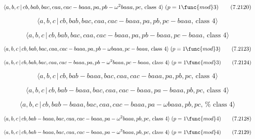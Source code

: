 \documentclass[10pt]{article}
\begin{document}
\begin{equation}
\langle a,b,c\,|\,cb,bab,bac,caa,cac-baaa,pa,pb-\omega ^{2}baaa,pc,\,\text{%
class }4\rangle \;(p=1\func{mod}3)  \tag{7.2120}
\end{equation}

\begin{equation}
\langle a,b,c\,|\,cb,bab,bac,caa,cac-baaa,pa,pb,pc-baaa,\,\text{class }%
4\rangle  \tag{7.2121}
\end{equation}

\begin{equation}
\langle a,b,c\,|\,cb,bab,bac,caa,cac-baaa,pa,pb-baaa,pc-baaa,\,\text{class }%
4\rangle  \tag{7.2122}
\end{equation}

\begin{equation}
\langle a,b,c\,|\,cb,bab,bac,caa,cac-baaa,pa,pb-\omega baaa,pc-baaa,\,\text{%
class }4\rangle \;(p=1\func{mod}3)  \tag{7.2123}
\end{equation}

\begin{equation}
\langle a,b,c\,|\,cb,bab,bac,caa,cac-baaa,pa,pb-\omega ^{2}baaa,pc-baaa,\,%
\text{class }4\rangle \;(p=1\func{mod}3)  \tag{7.2124}
\end{equation}

\begin{equation}
\langle a,b,c\,|\,cb,bab-baaa,bac,caa,cac-baaa,pa,pb,pc,\,\text{class }%
4\rangle  \tag{7.2125}
\end{equation}

\begin{equation}
\langle a,b,c\,|\,cb,bab-baaa,bac,caa,cac-baaa,pa-baaa,pb,pc,\,\text{class }%
4\rangle  \tag{7.2126}
\end{equation}

\begin{equation}
\langle a,b,c\,|\,cb,bab-baaa,bac,caa,cac-baaa,pa-\omega baaa,pb,pc,\,\text{%
class }4\rangle  \tag{7.2127}
\end{equation}

\begin{equation}
\langle a,b,c\,|\,cb,bab-baaa,bac,caa,cac-baaa,pa-\omega ^{2}baaa,pb,pc,\,%
\text{class }4\rangle \;(p=1\func{mod}4)  \tag{7.2128}
\end{equation}

\begin{equation}
\langle a,b,c\,|\,cb,bab-baaa,bac,caa,cac-baaa,pa-\omega ^{3}baaa,pb,pc,\,%
\text{class }4\rangle \;(p=1\func{mod}4)  \tag{7.2129}
\end{equation}
\end{document}
